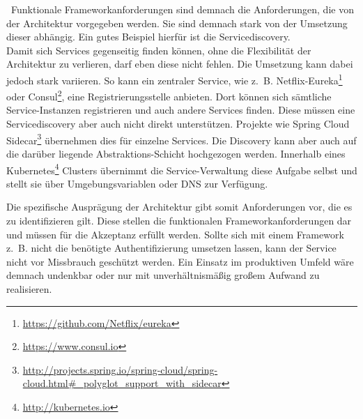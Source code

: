\
Funktionale Frameworkanforderungen sind demnach die Anforderungen, die von der Architektur vorgegeben werden. Sie sind demnach stark von der Umsetzung dieser abhängig. Ein gutes Beispiel hierfür ist die Servicediscovery.\\ 
Damit sich Services gegenseitig finden können, ohne die Flexibilität der Architektur zu verlieren, darf eben diese nicht fehlen. Die Umsetzung kann dabei jedoch stark variieren. So kann ein zentraler Service, wie z.~B. Netflix-Eureka\footnote{
\url{https://github.com/Netflix/eureka}
}
oder Consul\footnote{
\url{https://www.consul.io}
}, 
eine Registrierungsstelle anbieten. Dort können sich sämtliche Service-Instanzen registrieren und auch andere Services finden. Diese müssen eine Servicediscovery aber auch nicht direkt unterstützen. Projekte wie Spring Cloud Sidecar\footnote{
\url{http://projects.spring.io/spring-cloud/spring-cloud.html\#_polyglot_support_with_sidecar}
}
übernehmen dies für einzelne Services. Die Discovery kann aber auch auf die darüber liegende Abstraktions-Schicht hochgezogen werden. Innerhalb eines Kubernetes\footnote{
\url{http://kubernetes.io}
}
Clusters übernimmt die Service-Verwaltung diese Aufgabe selbst und stellt sie über Umgebungsvariablen oder DNS zur Verfügung. 


Die spezifische Ausprägung der Architektur gibt somit Anforderungen vor, die es zu identifizieren gilt. Diese stellen die funktionalen Frameworkanforderungen dar und müssen für die Akzeptanz erfüllt werden. Sollte sich mit einem Framework z.~B. nicht die benötigte Authentifizierung umsetzen lassen, kann der Service nicht vor Missbrauch geschützt werden. Ein Einsatz im produktiven Umfeld wäre demnach undenkbar oder nur mit unverhältnismäßig großem Aufwand zu realisieren.

